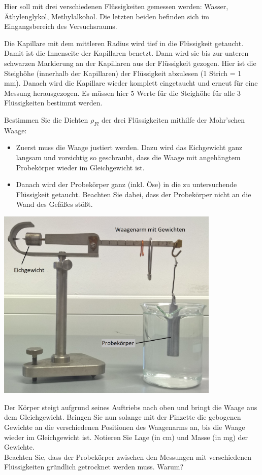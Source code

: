 Hier soll mit drei verschiedenen Flüssigkeiten gemessen werden: Wasser, Äthylenglykol, Methylalkohol. Die letzten beiden befinden sich im Eingangsbereich des Versuchsraums.
%
\begin{enumerate} \setcounter{enumi}{3}
 \item Die Kapillare mit dem mittleren Radius wird tief in die Flüssigkeit getaucht. Damit ist die Innenseite der Kapillaren benetzt. Dann wird sie bis zur unteren schwarzen Markierung an der Kapillaren aus der Flüssigkeit gezogen. Hier ist die Steighöhe (innerhalb der Kapillaren) der Flüssigkeit abzulesen (1 Strich = 1 mm). Danach wird die Kapillare wieder komplett eingetaucht und erneut für eine Messung herausgezogen. Es müssen hier 5 Werte für die Steighöhe für alle 3 Flüssigkeiten bestimmt werden.
 
\begin{minipage}{0.5\textwidth}
 \item Bestimmen Sie die Dichten $\rho_{Fl}$ der drei Flüssigkeiten mithilfe der Mohr'schen Waage:
  \begin{itemize}
   \item Zuerst muss die Waage justiert werden. Dazu wird das Eichgewicht ganz langsam und vorsichtig so geschraubt, dass die Waage mit angehängtem Probekörper wieder im Gleichgewicht ist. 
   \item Danach wird der Probekörper ganz (inkl. Öse) in die zu untersuchende Flüssigkeit getaucht. Beachten Sie dabei, dass der Probekörper nicht an die Wand des Gefäßes stößt.
  \end{itemize}
\end{minipage}
%
\begin{minipage}{0.5\textwidth}
	\centering
	\includegraphics[width=0.8\textwidth]{Abbildungen/V7-3.jpg}
\end{minipage}

  Der Körper steigt aufgrund seines Auftriebs nach oben und bringt die Waage aus dem Gleichgewicht. Bringen Sie nun solange mit der Pinzette die gebogenen Gewichte an die verschiedenen Positionen des Waagenarms an, bis die Waage wieder im Gleichgewicht ist. Notieren Sie Lage (in cm) und Masse (in mg) der Gewichte.\\
  
  Beachten Sie, dass der Probekörper zwischen den Messungen mit verschiedenen Flüssigkeiten gründlich getrocknet werden muss. Warum?
\end{enumerate}
